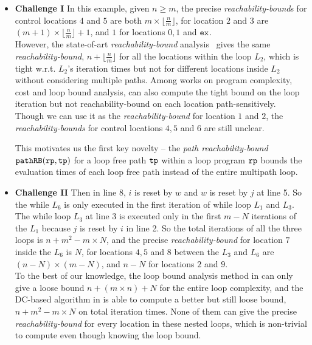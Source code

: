 \begin{itemize}
  \item \textbf{Challenge I}
  In this example, given $n \geq m$,
the precise \emph{reachability-bound}s for control locations $4$ and $5$ are both $m \times \lfloor\frac{n}{m}\rfloor$,
for location $2$ and $3$ are $(m + 1) \times \lfloor\frac{n}{m}\rfloor + 1$, 
and $1$ for locations $0, 1$ and $\mathtt{ex}$. 
\\
However, the state-of-art \emph{reachability-bound} analysis~\cite{GulwaniZ10}
gives the same \emph{reachability-bound}, $n + \lfloor\frac{n}{m}\rfloor$ for all the locations within the loop $L_2$, which is tight w.r.t. $L_2$'s iteration times but not for different locations inside $L_2$ without considering multiple paths.
Among works on program complexity, cost and loop bound analysis, \cite{GulwaniJK09} can also compute the tight bound on the loop iteration but not reachability-bound on each location path-sensitively.
Though we can use it as the \emph{reachability-bound} for location $1$ and $2$,
the \emph{reachability-bounds} for control locations $4, 5$ and $6$ are still unclear.

This motivates us the first key novelty -- the \emph{path reachability-bound} $\mathtt{pathRB}(\mathtt{rp}, \mathtt{tp})$ for a loop free path $\mathtt{tp}$ within a loop program $\mathtt{rp}$ bounds the evaluation times of each loop free path instead of the entire multipath loop.
\item \textbf{Challenge II}
  Then in line 8, $i$ is reset by $w$ and $w$ is reset by $j$ at line 5. So the
while $L_6$ is only executed in the first iteration of while loop $L_1$ and $L_3$.
The while loop $L_3$ at line 3 is executed only in 
the first $m - N$ iterations of the 
$L_1$ because $j$ is reset by $i$ in line 2.
So the total iterations of all the three loops is
$n + m^2 - m \times N$,
and the precise \emph{reachability-bound} for location $7$ inside the $L_6$ is $N$,
for locations $4, 5$ and $8$ between the $L_3$ and $L_6$ are $(n-N) \times (m - N)$,
and $n - N$ for locations $2$ and $9$.
\\
To the best of our knowledge, the loop bound analysis method in \cite{GulwaniJK09} can only give a loose bound $n + (m \times n) + N$ for the entire loop complexity, and 
the DC-based algorithm in \cite{SinnZV17} is able to
compute a better but still loose bound, $n + m^2 - m \times N$ on total iteration times.
None of them can give the precise \emph{reachability-bound} for every location in these nested loops,
which is non-trivial to compute even though knowing the loop bound.


\end{itemize}
